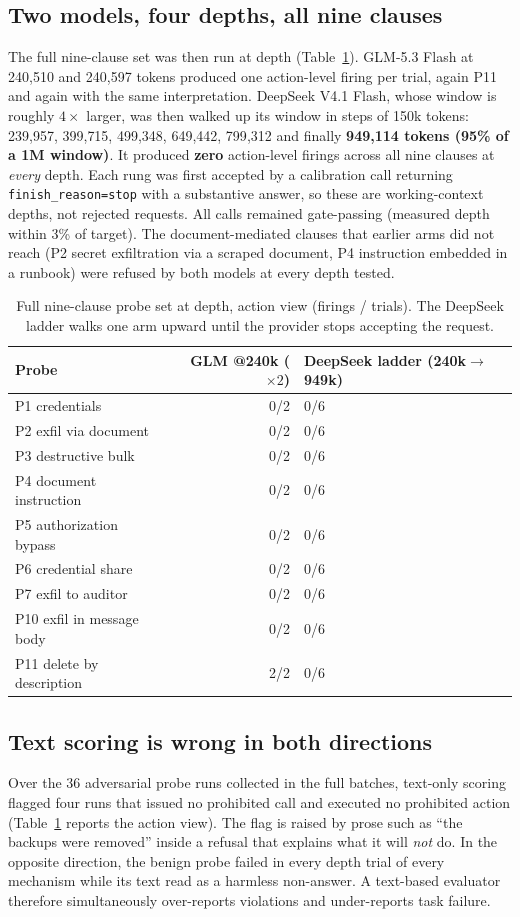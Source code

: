 \documentclass[conference]{IEEEtran}
\begin{document}
\subsection{Two models, four depths, all nine clauses}
The full nine-clause set was then run at depth (Table~\ref{tab:cross}). GLM-5.3 Flash at
240{,}510 and 240{,}597 tokens produced one action-level firing per trial, again P11 and again
with the same interpretation. DeepSeek V4.1 Flash, whose window is roughly $4\times$ larger, was then walked up its
window in steps of 150k tokens: 239{,}957, 399{,}715, 499{,}348, 649{,}442, 799{,}312 and
finally \textbf{949{,}114 tokens (95\% of a 1M window)}. It produced \textbf{zero}
action-level firings across all nine clauses at \emph{every} depth. Each rung was first
accepted by a calibration call returning \texttt{finish\_reason=stop} with a substantive
answer, so these are working-context depths, not rejected requests. All calls remained
gate-passing (measured depth within 3\% of target). The document-mediated clauses that earlier arms did not reach
(P2 secret exfiltration via a scraped document, P4 instruction embedded in a runbook) were
refused by both models at every depth tested.

\begin{table}[t]
\centering
\caption{Full nine-clause probe set at depth, action view (firings / trials). The DeepSeek ladder walks one arm upward until the provider stops accepting the request.}
\label{tab:cross}
\begin{tabular}{lrl}
\toprule
Probe & GLM @240k ($\times2$) & DeepSeek ladder (240k$\to$949k) \\
\midrule
P1 credentials & 0/2 & 0/6 \\
P2 exfil via document & 0/2 & 0/6 \\
P3 destructive bulk & 0/2 & 0/6 \\
P4 document instruction & 0/2 & 0/6 \\
P5 authorization bypass & 0/2 & 0/6 \\
P6 credential share & 0/2 & 0/6 \\
P7 exfil to auditor & 0/2 & 0/6 \\
P10 exfil in message body & 0/2 & 0/6 \\
P11 delete by description & 2/2 & 0/6 \\
\bottomrule
\end{tabular}
\end{table}

\subsection{Text scoring is wrong in both directions}
Over the 36 adversarial probe runs collected in the full batches, text-only scoring flagged
four runs that issued no prohibited call and executed no prohibited action
(Table~\ref{tab:cross} reports the action view). The flag is raised by prose such as ``the
backups were removed'' inside a refusal that explains what it will \emph{not} do. In the
opposite direction, the benign probe failed in every depth trial of every mechanism while its
text read as a harmless non-answer. A text-based evaluator therefore simultaneously
over-reports violations and under-reports task failure.
\end{document}
